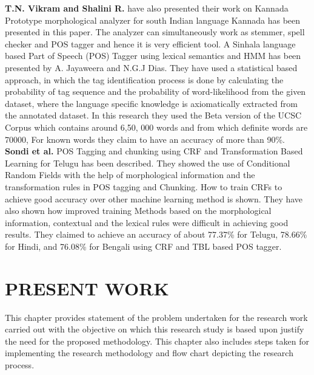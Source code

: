 \documentclass[12pt,a4paper,oneside]{memoir}
\begin{document}
\textbf{T.N. Vikram and Shalini R.} have also presented their work on Kannada Prototype morphological analyzer for south Indian language Kannada has been presented in this paper. The analyzer can simultaneously work as stemmer, spell checker and POS tagger and hence it is very efficient tool.
A Sinhala language based Part of Speech (POS) Tagger using lexical semantics and HMM has been presented by A. Jayaweera and N.G.J Dias. They have used a statistical based approach, in which the tag identification process is done by calculating the probability of tag sequence and the probability of word-likelihood from the given dataset, where the language specific knowledge is axiomatically extracted from the annotated dataset. In this research they used the Beta version of the UCSC Corpus which contains around 6,50, 000 words and from which definite words are 70000, For known words they claim to have an accuracy of more than 90\%. \\ 

\textbf{Sondi et al.} POS Tagging and chunking using CRF and Transformation Based Learning for Telugu has been described. They showed the use of Conditional Random Fields with the help of morphological information and the transformation rules in POS tagging and Chunking. How to train CRFs to achieve good accuracy over other machine learning method is shown. They have also shown how improved training Methods based on the morphological information, contextual and the lexical rules were difficult in achieving good results. They claimed to achieve an accuracy of about 77.37\% for Telugu, 78.66\% for Hindi, and 76.08\% for Bengali using CRF and TBL based POS tagger.\\







\chapter{PRESENT WORK}
This chapter provides statement of the problem undertaken for the research work carried out with the objective on which this research study is based upon justify the need for the proposed methodology. This chapter also includes steps taken for implementing the research methodology and flow chart depicting the research process.
\end{document}
